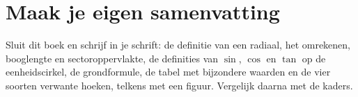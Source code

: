 \begin{oefeningen}







\end{oefeningen}


\ifzelfstudie
\section*{Maak je eigen samenvatting}
Sluit dit boek en schrijf in je schrift: de definitie van een radiaal, het omrekenen, booglengte en sectoroppervlakte, de definities van $\sin$, $\cos$ en $\tan$ op de eenheidscirkel, de grondformule, de tabel met bijzondere waarden en de vier soorten verwante hoeken, telkens met een figuur. Vergelijk daarna met de kaders.
\fi
